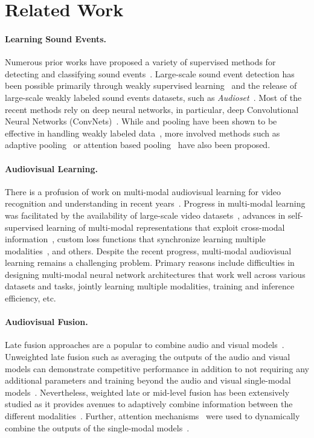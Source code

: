 \documentclass{article}
\begin{document}
\section{Related Work}\label{sec:related}

\paragraph{Learning Sound Events.}
Numerous prior works have proposed a variety of supervised methods for detecting and classifying sound events~\cite{virtanen2018computational,kumar2018acoustic}.
Large-scale sound event detection has been possible primarily through weakly supervised learning~\cite{Kumar2016} and the release of large-scale weakly labeled sound events datasets, such as \emph{Audioset}~\cite{Gemmeke2017}.
Most of the recent methods rely on deep neural networks, in particular, deep Convolutional Neural Networks (ConvNets)~\cite{kumar2019secost,Adavanne2019,kong2019weakly,ford2019deep}.
While  and  pooling have been shown to be effective in handling weakly labeled data~\cite{kumar2018acoustic}, more involved methods such as adaptive pooling~\cite{mcfee2018adaptive} or attention based pooling~\cite{wang2019comparison,kong2019weakly} have also been proposed.

\paragraph{Audiovisual Learning.}
There is a profusion of work on multi-modal audiovisual learning for video recognition and understanding in recent years~\cite{Baltruvsaitis2018}.
Progress in multi-modal learning was facilitated by the availability of large-scale video datasets~\cite{Kay2017,Gemmeke2017,Gu2018}, advances in self-supervised learning of multi-modal representations that exploit cross-modal information~\cite{Aytar2016,Arandjelovic2017,Owens2018,Korbar2018}, custom loss functions that synchronize learning multiple modalities~\cite{Wang2019}, and others.
Despite the recent progress, multi-modal audiovisual learning remains a challenging problem.
Primary reasons include difficulties in designing multi-modal neural network architectures that work well across various datasets and tasks, jointly learning multiple modalities, training and inference efficiency, etc.

\paragraph{Audiovisual Fusion.}
Late fusion approaches are a popular to combine audio and visual models~\cite{Ghanem2018}.
Unweighted late fusion such as averaging the outputs of the audio and visual models can demonstrate competitive performance in addition to not requiring any additional parameters and training beyond the audio and visual single-modal models~\cite{Lan2012}.
Nevertheless, weighted late or mid-level fusion has been extensively studied as it provides avenues to adaptively combine information between the different modalities~\cite{Lan2012,Wu2016,Kazakos2019}.
Further, attention mechanisms~\cite{Bahdanau2014} were used to dynamically combine the outputs of the single-modal models~\cite{Long2018,sterpu2018attention,hori2018multimodal,Zhou2019,Lin2019}.
\end{document}

